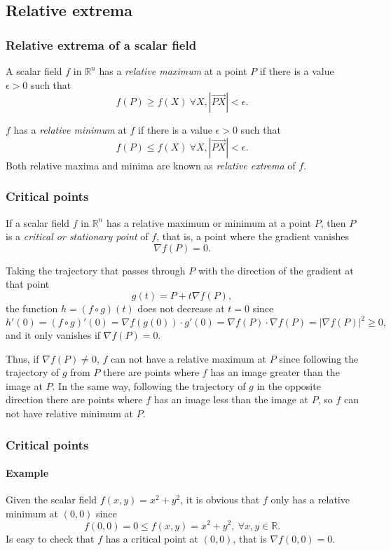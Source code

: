 \subsection{Relative extrema}
\begin{frame}
\frametitle{Relative extrema of a scalar field}
\begin{definition}
A scalar field $f$ in $\mathbb{R}^n$ has a \emph{relative maximum} at a point $P$ if there is a value $\epsilon>0$ such that 
\[
f(P)\geq f(X)\ \forall X, |\vec{PX}|<\epsilon.
\]

$f$ has a \emph{relative minimum} at $f$ if there is a value $\epsilon>0$ such that
\[
f(P)\leq f(X)\ \forall X, |\vec{PX}|<\epsilon.
\]
Both relative maxima and minima are known as \emph{relative extrema} of $f$.
\end{definition}
\end{frame}


\begin{frame}
\frametitle{Critical points}
\begin{theorem}
If a scalar field $f$ in $\mathbb{R}^n$ has a relative maximum or minimum at a point $P$, then $P$ is a \emph{critical or stationary point} of $f$, that is, a point where the gradient vanishes
\[
\nabla f(P) = 0.
\]
\end{theorem}

Taking the trajectory that passes through $P$ with the direction of the gradient at that point
\[
g(t)=P+t\nabla f(P),
\]
the function $h=(f\circ g)(t)$ does not decrease at $t=0$ since
\[
h'(0)= (f\circ g)'(0) = \nabla f(g(0))\cdot g'(0) = \nabla f(P)\cdot \nabla f(P) = |\nabla f(P)|^2\geq 0,
\]
and it only vanishes if $\nabla f(P)=0$.

Thus, if $\nabla f(P)\neq 0$, $f$ can not have a relative maximum at $P$ since following the trajectory of $g$ from $P$ there are points where $f$ has an image greater than the image at $P$.
In the same way, following the trajectory of $g$ in the opposite direction there are points where $f$ has an image less than the image at $P$, so $f$ can not have relative minimum at $P$. 
\end{frame}


\begin{frame}
\frametitle{Critical points}
\framesubtitle{Example}
Given the scalar field $f(x,y)=x^2+y^2$, it is obvious that $f$ only has a relative minimum at $(0,0)$ since
\[
f(0,0)=0 \leq f(x,y)=x^2+y^2,\ \forall x,y\in \mathbb{R}.
\]
Is easy to check that $f$ has a critical point at $(0,0)$, that is $\nabla f(0,0) = 0$.
\begin{center}

\end{center}
\end{frame}


